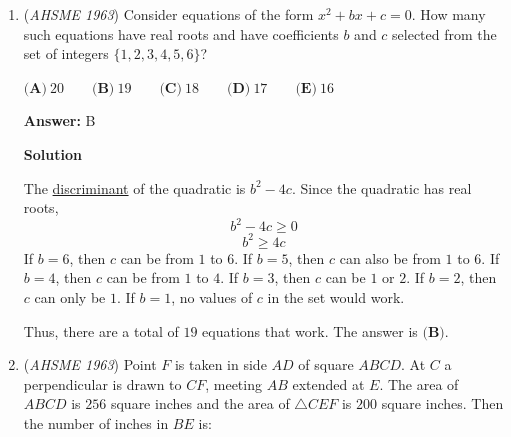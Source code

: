 \begin{enumerate}
 Since all of them have $16$ cents in the end, we can write a \href{https://artofproblemsolving.com/wiki/index.php?title=System\_of\_equations}{system of equations}.
 \[4a-4b-4c=16\]
 \[-2a+6b-2c=16\]
 \[-a-b+7c=16\]Note that adding the three equation yields $a+b+c=48$, so $4a+4b+4c=192$.  Therefore, $8a=208$, so $a = 26$.  Solving for $a$ can also be done traditionally.

 Thus, $A$ started out with $26$ cents, which is answer choice $\boxed{\textbf{(B)}}$.

 


 



\textbf{Solution 2}

We know that people not giving away money on the previous turn now have twice what they previously had. Using the fact that the sum of their money is $48$ cents, we can work backward
 \[16,16,16\]
 \[8,8,32\]
 \[4,28,16\]
 \[26,14,8\]Thus at the beginning $A$ has $26\boxed{B}$ cents.

 


	\item (\textit{AHSME 1963}) Consider equations of the form $x^2 + bx + c = 0$. How many such equations have real roots and have coefficients $b$ and $c$ selected 
from the set of integers $\{1,2,3, 4, 5,6\}$?


 $\textbf{(A)}\ 20 \qquad \textbf{(B)}\ 19 \qquad \textbf{(C)}\ 18 \qquad \textbf{(D)}\ 17 \qquad \textbf{(E)}\ 16$

 \textbf{Answer: }B



\textbf{Solution}

The \href{https://artofproblemsolving.com/wiki/index.php?title=Discriminant}{discriminant} of the quadratic is $b^2 - 4c$.  Since the quadratic has real roots,
 \[b^2 - 4c \ge 0\]
 \[b^2 \ge 4c\]If $b = 6$, then $c$ can be from $1$ to $6$.  If $b = 5$, then $c$ can also be from $1$ to $6$.  If $b=4$, then $c$ can be from $1$ to $4$.  If $b=3$, then $c$ can be $1$ or $2$.  If $b=2$, then $c$ can only be $1$.  If $b = 1$, no values of $c$ in the set would work.

 Thus, there are a total of $19$ equations that work.  The answer is $\boxed{\textbf{(B)}}$.

 


	\item (\textit{AHSME 1963}) Point $F$ is taken in side $AD$ of square $ABCD$. At $C$ a perpendicular is drawn to $CF$, meeting $AB$ extended at $E$. 
The area of $ABCD$ is $256$ square inches and the area of $\triangle CEF$ is $200$ square inches. Then the number of inches in $BE$ is:



\end{enumerate}

